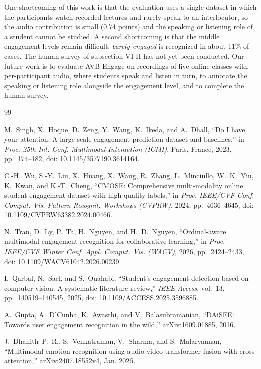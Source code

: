 \documentclass[journal]{IEEEtran}
\newcommand{\ournet}{AVB-Engage}
\begin{document}
One shortcoming of this work is that the evaluation uses a single dataset in which the participants watch recorded lectures and rarely speak to an interlocutor, so the audio contribution is small (0.74 points) and the speaking or listening role of a student cannot be studied. A second shortcoming is that the middle engagement levels remain difficult: \emph{barely engaged} is recognized in about 11\% of cases. The human survey of subsection VI-H has not yet been conducted. Our future work is to evaluate \ournet{} on recordings of live online classes with per-participant audio, where students speak and listen in turn, to annotate the speaking or listening role alongside the engagement level, and to complete the human survey.

\ifCLASSOPTIONcaptionsoff
  \newpage
\fi

\begin{thebibliography}{99}

M.~Singh, X.~Hoque, D.~Zeng, Y.~Wang, K.~Ikeda, and A.~Dhall, ``Do I have your attention: A large scale engagement prediction dataset and baselines,'' in \emph{Proc. 25th Int. Conf. Multimodal Interaction (ICMI)}, Paris, France, 2023, pp.~174--182, doi: 10.1145/3577190.3614164.

C.-H.~Wu, S.-Y.~Liu, X.~Huang, X.~Wang, R.~Zhang, L.~Minciullo, W.~K.~Yiu, K.~Kwan, and K.-T.~Cheng, ``CMOSE: Comprehensive multi-modality online student engagement dataset with high-quality labels,'' in \emph{Proc. IEEE/CVF Conf. Comput. Vis. Pattern Recognit. Workshops (CVPRW)}, 2024, pp.~4636--4645, doi: 10.1109/CVPRW63382.2024.00466.

N.~Tran, D.~Ly, P.~Ta, H.~Nguyen, and H.~D.~Nguyen, ``Ordinal-aware multimodal engagement recognition for collaborative learning,'' in \emph{Proc. IEEE/CVF Winter Conf. Appl. Comput. Vis. (WACV)}, 2026, pp.~2424--2433, doi: 10.1109/WACV61042.2026.00239.

I.~Qarbal, N.~Sael, and S.~Ouahabi, ``Student's engagement detection based on computer vision: A systematic literature review,'' \emph{IEEE Access}, vol.~13, pp.~140519--140545, 2025, doi: 10.1109/ACCESS.2025.3596885.

A.~Gupta, A.~D'Cunha, K.~Awasthi, and V.~Balasubramanian, ``DAiSEE: Towards user engagement recognition in the wild,'' arXiv:1609.01885, 2016.

J.~Dhanith~P.~R., S.~Venkatraman, V.~Sharma, and S.~Malarvannan, ``Multimodal emotion recognition using audio-video transformer fusion with cross attention,'' arXiv:2407.18552v4, Jan. 2026.


\end{thebibliography}
\end{document}
